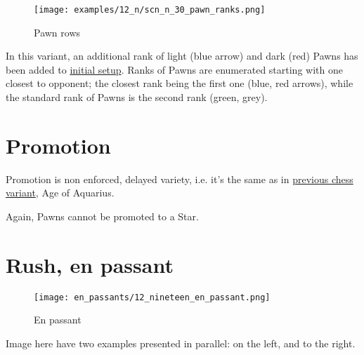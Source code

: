 \vspace*{-1.1\baselineskip}
\noindent
\begin{figure}[!h]
\texttt{[image: examples/12\_n/scn\_n\_30\_pawn\_ranks.png]}
\caption{Pawn rows}
\label{fig:scn_n_30_pawn_ranks}
\end{figure}

In this variant, an additional rank of light (blue arrow) and dark (red) Pawns has
been added to \hyperref[fig:12_nineteen]{initial setup}. Ranks of Pawns are enumerated
starting with one closest to opponent; the closest rank being the first one (blue,
red arrows), while the standard rank of Pawns is the second rank (green, grey).

\clearpage %

\section*{Promotion}
\label{sec:Nineteen/Promotion}

Promotion is non enforced, delayed variety, i.e. it's the same as in
\hyperref[sec:Age of Aquarius/Promotion]{previous chess variant}, Age of Aquarius.

\noindent
Again, Pawns cannot be promoted to a Star.



\section*{Rush, en passant}
\label{sec:Nineteen/Rush, en passant}

\vspace*{-0.3\baselineskip}
\noindent
\begin{wrapfigure}[14]{l}{0.4\textwidth}
\centering
\texttt{[image: en\_passants/12\_nineteen\_en\_passant.png]}
\caption{En passant}
\label{fig:12_nineteen_en_passant}
\end{wrapfigure}
Image here have two examples presented in parallel: on the left, and to the right.

